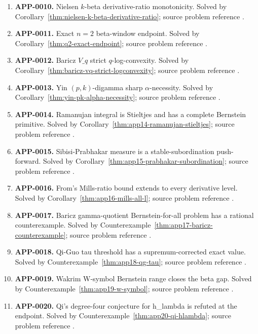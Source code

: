\documentclass[11pt]{article}
\numberwithin{equation}{section}
\theoremstyle{definition}
\theoremstyle{remark}
\newcommand{\1}{\mathbf 1}
\begin{document}
\begin{enumerate}
\item \label{ledger:app-0010}\textbf{APP-0010.} Nielsen \(k\)-beta derivative-ratio monotonicity. Solved by Corollary~\ref{thm:nielsen-k-beta-derivative-ratio}; source problem reference \cite{yin-zhang-k-beta}.
\item \label{ledger:app-0011}\textbf{APP-0011.} Exact \(n=2\) beta-window endpoint. Solved by Corollary~\ref{thm:q2-exact-endpoint}; source problem reference \cite{app-app-0004-source}.
\item \label{ledger:app-0012}\textbf{APP-0012.} Baricz \(V\_q\) strict \(q\)-log-convexity. Solved by Corollary~\ref{thm:baricz-vq-strict-logconvexity}; source problem reference \cite{baricz-turan-thesis}.
\item \label{ledger:app-0013}\textbf{APP-0013.} Yin \((p,k)\)-digamma sharp \(\alpha\)-necessity. Solved by Corollary~\ref{thm:yin-pk-alpha-necessity}; source problem reference \cite{yin-pk-digamma}.
\item \label{ledger:app-0014}\textbf{APP-0014.} Ramanujan integral is Stieltjes and has a complete Bernstein primitive. Solved by Corollary~\ref{thm:app14-ramanujan-stieltjes}; source problem reference \cite{mishra-swaminathan-ramanujan}.
\item \label{ledger:app-0015}\textbf{APP-0015.} Sibisi-Prabhakar measure is a stable-subordination push-forward. Solved by Corollary~\ref{thm:app15-prabhakar-subordination}; source problem reference \cite{sibisi-prabhakar}.
\item \label{ledger:app-0016}\textbf{APP-0016.} From's Mills-ratio bound extends to every derivative level. Solved by Corollary~\ref{thm:app16-mills-all-l}; source problem reference \cite{from-mills}.
\item \label{ledger:app-0017}\textbf{APP-0017.} Baricz gamma-quotient Bernstein-for-all problem has a rational counterexample. Solved by Counterexample~\ref{thm:app17-baricz-counterexample}; source problem reference \cite{baricz-turan}.
\item \label{ledger:app-0018}\textbf{APP-0018.} Qi-Guo tau threshold has a supremum-corrected exact value. Solved by Counterexample~\ref{thm:app18-qg-tau}; source problem reference \cite{qi-guo-2004}.
\item \label{ledger:app-0019}\textbf{APP-0019.} Wakrim W-symbol Bernstein range closes the beta gap. Solved by Counterexample~\ref{thm:app19-w-symbol}; source problem reference \cite{wakrim-w}.
\item \label{ledger:app-0020}\textbf{APP-0020.} Qi's degree-four conjecture for h\_lambda is refuted at the endpoint. Solved by Counterexample~\ref{thm:app20-qi-hlambda}; source problem reference \cite{qi-hlambda}.

\end{enumerate}
\end{document}
